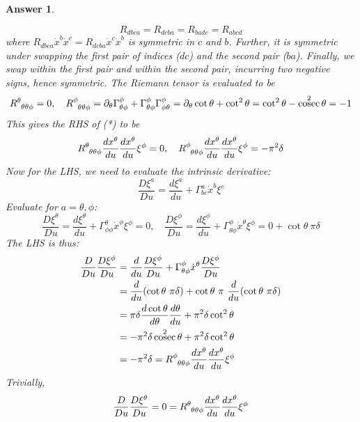 \documentclass[a4paper]{article}
\DeclareMathOperator{\cosec}{cosec}
\theoremstyle{new2}
\newtheorem{ans}{Answer}[section]
\theoremstyle{new}
\begin{document}
\begin{ans}
\begin{enumerate}[label=(\alph*)]
$$R_{dbca}=R_{dcba}=R_{badc}=R_{abcd}$$
where $R_{dbca}\dot{x}^b\dot{x}^c=R_{dcba}\dot{x}^c\dot{x}^b$ is symmetric in $c$ and $b$. Further, it is symmetric under swapping the first pair of indices ($dc$) and the second pair ($ba$). Finally, we swap within the first pair and within the second pair, incurring two negative signs, hence symmetric. The Riemann tensor is evaluated to be
$$\tensor*{R}{*_{}^{\theta}_{\theta\theta\phi}}=0,\quad\tensor*{R}{*_{}^{\phi}_{\theta\theta\phi}}=\partial_\theta\Gamma^\phi_{\theta\phi}+\Gamma_{\theta\phi}^\phi\Gamma_{\phi\theta}^\phi=\partial_\theta\cot\theta+\cot^2\theta=\cot^2\theta-\cosec^2\theta=-1$$
This gives the RHS of (*) to be
$$\tensor*{R}{*_{}^{\theta}_{\theta\theta\phi}}\frac{dx^\theta}{du}\frac{dx^\theta}{du}\xi^\phi=0,\quad\tensor*{R}{*_{}^{\phi}_{\theta\theta\phi}}\frac{dx^\theta}{du}\frac{dx^\theta}{du}\xi^\phi=-\pi^2\delta$$
Now for the LHS, we need to evaluate the intrinsic derivative:
$$\frac{D\xi^a}{Du}=\frac{d\xi^a}{du}+\Gamma^a_{bc}\dot{x}^b\xi^c$$
Evaluate for $a=\theta,\phi$:
$$\frac{D\xi^\theta}{Du}=\frac{d\xi^\theta}{du}+\Gamma^\theta_{\phi\phi}\dot{x}^\phi\xi^\phi=0,\quad\frac{D\xi^\phi}{Du}=\frac{d\xi^\phi}{du}+\Gamma^\phi_{\theta\phi}\dot{x}^\theta\xi^\phi=0+\cot\theta~\pi\delta$$
The LHS is thus:
\begin{align}
\frac{D}{Du}\frac{D\xi^\phi}{Du}&=\frac{d}{du}\frac{D\xi^\phi}{Du}+\Gamma^\phi_{\theta\phi}\dot{x}^\theta\frac{D\xi^\phi}{Du}\nonumber\\&=
\frac{d}{du}(\cot\theta~\pi\delta)+\cot\theta~\pi~\frac{d}{du}(\cot\theta~\pi\delta)\nonumber\\&=\pi\delta\frac{d\cot\theta}{d\theta}\frac{d\theta}{du}+\pi^2\delta\cot^2\theta\nonumber\\&=-\pi^2\delta\cosec^2\theta+\pi^2\delta\cot^2\theta\nonumber\\&=-\pi^2\delta=\tensor*{R}{*_{}^{\phi}_{\theta\theta\phi}}\frac{dx^\theta}{du}\frac{dx^\theta}{du}\xi^\phi\nonumber
\end{align}
Trivially,
$$\frac{D}{Du}\frac{D\xi^\theta}{Du}=0=\tensor*{R}{*_{}^{\theta}_{\theta\theta\phi}}\frac{dx^\theta}{du}\frac{dx^\theta}{du}\xi^\phi$$
\end{enumerate}
\end{ans}
\end{document}
